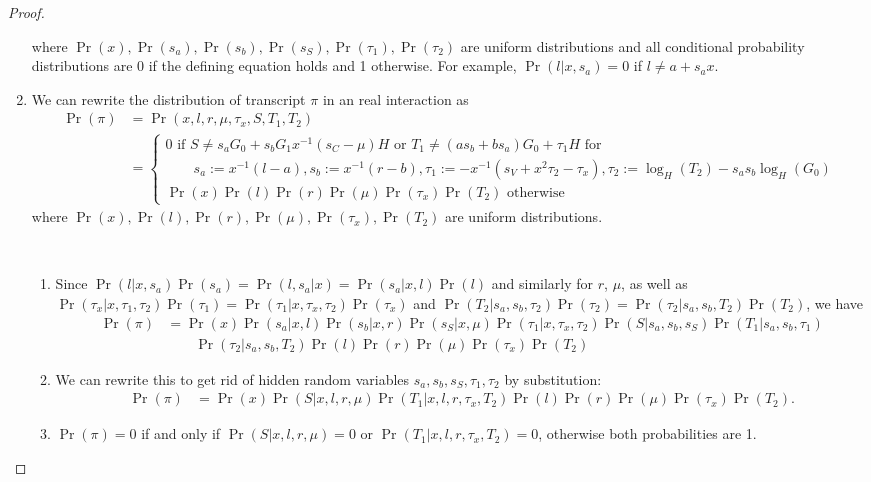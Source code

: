 \begin{proof}
\begin{enumerate}
    where $\Pr(x),\Pr(s_a),\Pr(s_b),\Pr(s_S),\Pr(\tau_1),\Pr(\tau_2)$ are uniform distributions and all conditional probability distributions are 0 if the defining equation holds and 1 otherwise. For example, $\Pr(l|x, s_a) = 0$ if $l\ne a + s_ax$.
   \item We can rewrite the distribution of transcript $\pi$ in an real interaction as
    \begin{align*}
        \Pr(\pi) &= \Pr(x, l, r, \mu, \tau_x, S, T_1, T_2)\\
                        &= \begin{cases} 0 \text{ if } S \ne s_aG_0 + s_bG_1 x^{-1}(s_C - \mu)H \text{ or } T_1 \ne (as_b + bs_a)G_0 + \tau_1H \text{ for }\\ \qquad s_a := x^{-1}(l - a), s_b := x^{-1}(r - b), \tau_1 := - x^{-1}(s_V  + x^2\tau_2 - \tau_x), \tau_2 := \log_H(T_2) - s_as_b\log_H(G_0) \\
                             \Pr(x)\Pr(l)\Pr(r)\Pr(\mu)\Pr(\tau_x)\Pr(T_2) \text{ otherwise}
                             \end{cases}
    \end{align*}
    where $\Pr(x),\Pr(l),\Pr(r),\Pr(\mu),\Pr(\tau_x),\Pr(T_2)$ are uniform distributions.
   \begin{innerproof}
     $ $\par
     \begin{enumerate}
     \item Since $\Pr(l|x, s_a)\Pr(s_a) = \Pr(l,s_a|x) = \Pr(s_a|x, l) \Pr(l)$ and similarly for $r$, $\mu$, as well as $\Pr(\tau_x| x, \tau_1, \tau_2)\Pr(\tau_1 ) = \Pr(\tau_1| x, \tau_x, \tau_2)\Pr(\tau_x )$ and $\Pr(T_2| s_a, s_b, \tau_2)\Pr(\tau_2) = \Pr(\tau_2| s_a, s_b, T_2)\Pr(T_2)$,
       we have
       \begin{align*}
      \Pr(\pi) &= \Pr(x) \Pr(s_a|x, l) \Pr(s_b|x, r) \Pr(s_S| x, \mu) \Pr(\tau_1| x, \tau_x, \tau_2) \Pr(S| s_a, s_b, s_S) \Pr(T_1| s_a, s_b, \tau_1)\\
      &\qquad \Pr(\tau_2| s_a, s_b, T_2) \Pr(l)\Pr(r)\Pr(\mu)\Pr(\tau_x )\Pr(T_2)
       \end{align*}
     \item We can rewrite this to get rid of hidden random variables $s_a, s_b, s_S, \tau_1, \tau_2$ by substitution:
       \begin{align*}
      \Pr(\pi) &= \Pr(x) \Pr(S| x, l, r, \mu) \Pr(T_1| x, l, r, \tau_x, T_2) \Pr(l)\Pr(r)\Pr(\mu)\Pr(\tau_x )\Pr(T_2).
       \end{align*}
     \item $\Pr(\pi) = 0$ if and only if $\Pr(S| x, l, r, \mu) = 0$ or $\Pr(T_1| x, l, r, \tau_x, T_2) = 0$, otherwise both probabilities are 1.

\end{enumerate}
\end{innerproof}
\end{enumerate}
\end{proof}
